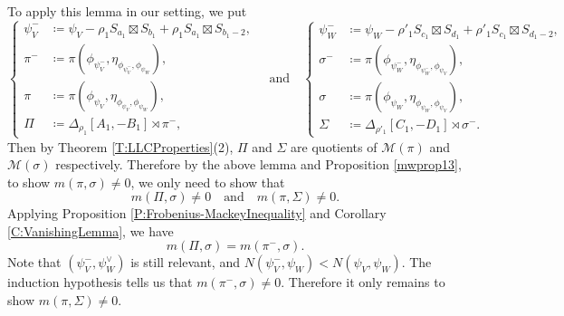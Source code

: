 \documentclass[11pt,letterpaper]{amsart}
\theoremstyle{plain}
\numberwithin{theorem}{section}
\numberwithin{equation}{subsection}
\theoremstyle{remark}
\def\calM{\mathcal{M}}
\begin{document}
\vskip 5pt

To apply this lemma in our setting, we put
\[
    \left\{\begin{aligned}
        \psi_V^-&\coloneqq \psi_V-\rho_1 S_{a_1}\boxtimes S_{b_1} + \rho_1 S_{a_1}\boxtimes S_{b_1-2},\\
        \pi^-&\coloneqq \pi\left(\phi_{\psi_V^-},\eta_{\phi_{\psi_V^-},\phi_{\psi_W}}\right),\\
        \pi&\coloneqq\pi\left(\phi_{\psi_V},\eta_{\phi_{\psi_V},\phi_{\psi_W}}\right),\\
        \Pi&\coloneqq \Delta_{\rho_1}\left[A_1,-B_1\right]\rtimes\pi^-,
    \end{aligned}\right.
    \quad \text{and}\quad
    \left\{\begin{aligned}
        \psi_W^-&\coloneqq \psi_W-\rho'_1 S_{c_1}\boxtimes S_{d_1} + \rho'_1 S_{c_1}\boxtimes S_{d_1-2},\\
        \sigma^-&\coloneqq \pi\left(\phi_{\psi_W^-},\eta_{\phi_{\psi_W^-},\phi_{\psi_V}}\right),\\
        \sigma&\coloneqq\pi\left(\phi_{\psi_W},\eta_{\phi_{\psi_W},\phi_{\psi_V}}\right),\\
        \Sigma&\coloneqq \Delta_{\rho'_1}\left[C_1,-D_1\right]\rtimes\sigma^-.
    \end{aligned}\right.
\]
Then by Theorem \ref{T:LLCProperties}(2), $\Pi$ and $\Sigma$ are quotients of $\calM\left(\pi\right)$ and $\calM\left(\sigma\right)$ respectively. Therefore by the above lemma and Proposition \ref{mwprop13}, to show $m\left(\pi,\sigma\right)\neq0$, we only need to show that
\[
    m\left(\Pi,\sigma\right)\neq 0 \quad \text{and} \quad m\left(\pi,\Sigma\right)\neq 0.
\]
Applying Proposition \ref{P:Frobenius-MackeyInequality} and Corollary \ref{C:VanishingLemma}, we have
\[
    m\left(\Pi,\sigma\right) = m\left(\pi^-,\sigma\right).
\]
Note that $\left(\psi_V^-,\psi_W^\vee\right)$ is still relevant, and $N\left(\psi_V^-,\psi_W\right)<N\left(\psi_V,\psi_W\right)$. The induction hypothesis tells us that $m\left(\pi^-,\sigma\right)\neq 0$. Therefore it only remains to show $m\left(\pi,\Sigma\right)\neq 0$.

\vskip 5pt
\end{document}
